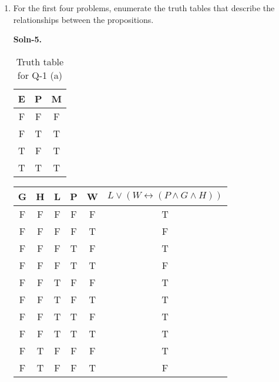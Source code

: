 \documentclass{article}
\begin{document}
\begin{enumerate}
\item   For the first four problems, enumerate the truth tables that
        describe the relationships between the propositions.

        \textbf{Soln-5.}  
        \begin{table} [H]
                \centering
                \begin{tabular}{ | c | c | c | }
                \hline
                \textbf{E} & \textbf{P} & \textbf{M} \\ [0.5 ex]
                \hline 
                F & F & F \\
                \hline
                F & T & T \\
                \hline
                T & F & T \\
                \hline
                T & T & T \\ [1ex]
                \hline
                \end{tabular}
                \caption{Truth table for Q-1 (a)}
                \label {table:1}
        \end{table}
        \begin{table} [H]
                \centering
                \begin{tabular}{ | c | c | c | c | c | c | }
                \hline
                \textbf{G} & \textbf{H} & \textbf{L} & \textbf{P} & \textbf{W} & \textbf{$L \vee (W \leftrightarrow (P \wedge G \wedge H))$} \\ [0.5 ex]
                \hline 
                F & F & F & F & F & T \\
                \hline
                F & F & F & F & T & F \\
                \hline
                F & F & F & T & F & T \\
                \hline
                F & F & F & T & T & F \\
                \hline
                F & F & T & F & F & T \\
                \hline
                F & F & T & F & T & T \\
                \hline
                F & F & T & T & F & T \\
                \hline
                F & F & T & T & T & T \\
                \hline
                F & T & F & F & F & T \\
                \hline
                F & T & F & F & T & F \\

\end{tabular}
\end{table}
\end{enumerate}
\end{document}
